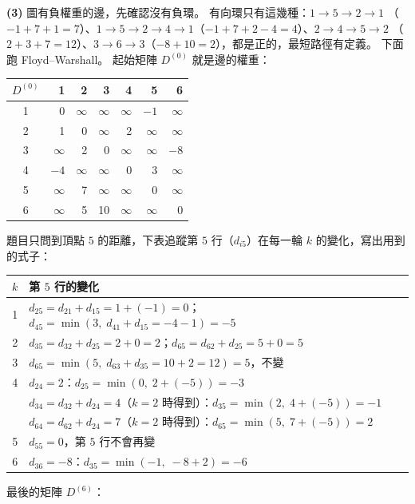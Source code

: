 \begin{pastsoln}
\textbf{(3)} 圖有負權重的邊，先確認沒有負環。 有向環只有這幾種：$1 \to 5 \to 2 \to 1$
（$-1 + 7 + 1 = 7$）、$1 \to 5 \to 2 \to 4 \to 1$（$-1 + 7 + 2 - 4 = 4$）、$2 \to 4 \to 5 \to 2$
（$2 + 3 + 7 = 12$）、$3 \to 6 \to 3$（$-8 + 10 = 2$），都是正的，最短路徑有定義。 下面跑
Floyd--Warshall。 起始矩陣 $D^{(0)}$ 就是邊的權重：
\begin{center}
\small
\begin{tabular}{c|rrrrrr}
$D^{(0)}$ & 1 & 2 & 3 & 4 & 5 & 6 \\ \hline
1 & 0 & $\infty$ & $\infty$ & $\infty$ & $-1$ & $\infty$ \\
2 & 1 & 0 & $\infty$ & 2 & $\infty$ & $\infty$ \\
3 & $\infty$ & 2 & 0 & $\infty$ & $\infty$ & $-8$ \\
4 & $-4$ & $\infty$ & $\infty$ & 0 & 3 & $\infty$ \\
5 & $\infty$ & 7 & $\infty$ & $\infty$ & 0 & $\infty$ \\
6 & $\infty$ & 5 & 10 & $\infty$ & $\infty$ & 0 \\
\end{tabular}
\end{center}
題目只問到頂點 $5$ 的距離，下表追蹤第 $5$ 行（$d_{i5}$）在每一輪 $k$ 的變化，寫出用到的式子：
\begin{center}
\small
\begin{tabular}{cl}
\toprule
$k$ & 第 $5$ 行的變化 \\
\midrule
1 & $d_{25} = d_{21} + d_{15} = 1 + (-1) = 0$；$d_{45} = \min(3,\; d_{41} + d_{15} = -4 - 1) = -5$ \\
2 & $d_{35} = d_{32} + d_{25} = 2 + 0 = 2$；$d_{65} = d_{62} + d_{25} = 5 + 0 = 5$ \\
3 & $d_{65} = \min(5,\; d_{63} + d_{35} = 10 + 2 = 12) = 5$，不變 \\
4 & $d_{24} = 2$：$d_{25} = \min(0,\; 2 + (-5)) = -3$ \\
  & $d_{34} = d_{32} + d_{24} = 4$（$k = 2$ 時得到）：$d_{35} = \min(2,\; 4 + (-5)) = -1$ \\
  & $d_{64} = d_{62} + d_{24} = 7$（$k = 2$ 時得到）：$d_{65} = \min(5,\; 7 + (-5)) = 2$ \\
5 & $d_{55} = 0$，第 $5$ 行不會再變 \\
6 & $d_{36} = -8$：$d_{35} = \min(-1,\; -8 + 2) = -6$ \\
\bottomrule
\end{tabular}
\end{center}
最後的矩陣 $D^{(6)}$：
\begin{center}

\end{center}
\end{pastsoln}
